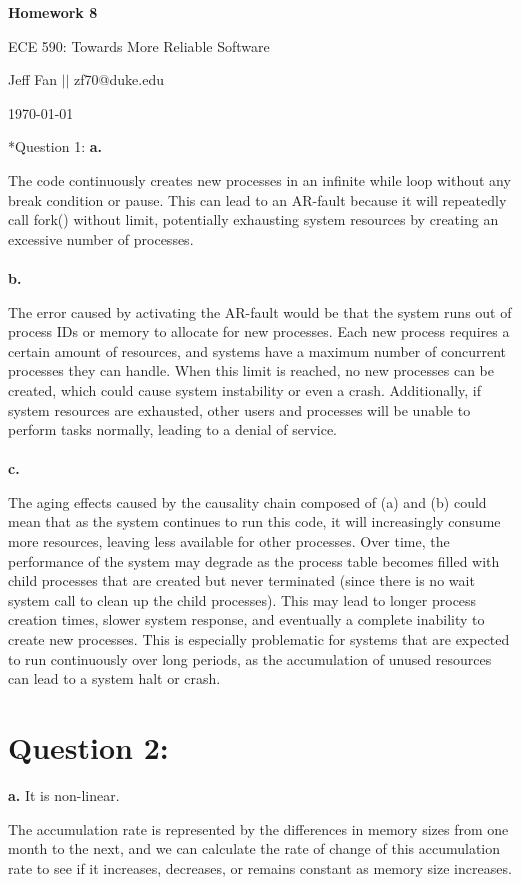 \documentclass[12pt]{article}
\makeatletter
\numberwithin{table}{section}
\newcommand{\question}[2][]{\begin{flushleft}
		\Large\textbf{Question #1}: \large\textit{#2}
		
\end{flushleft}}
\newcommand{\maketitletwo}[2][]{\begin{center}
		\Large{\textbf{Homework #1}
			
			ECE 590: Towards More Reliable Software} %
		\vspace{5pt}
		
		\normalsize{Jeff Fan  \hspace{1em} $\left|\right|$ \hspace{1em}zf70@duke.edu  %
			
			\today}        %
		\vspace{15pt}
		
\end{center}}
\makeatother
\begin{document}
	\maketitletwo[8]  %
	
	\section*{Question 1: } 
	\textbf{a.}
	
	The code continuously creates new processes in an infinite while loop without any break condition or pause. This can lead to an AR-fault because it will repeatedly call fork() without limit, potentially exhausting system resources by creating an excessive number of processes.\\
	\\
	\textbf{b.}
	
	The error caused by activating the AR-fault would be that the system runs out of process IDs or memory to allocate for new processes. Each new process requires a certain amount of resources, and systems have a maximum number of concurrent processes they can handle. When this limit is reached, no new processes can be created, which could cause system instability or even a crash. Additionally, if system resources are exhausted, other users and processes will be unable to perform tasks normally, leading to a denial of service.\\
	\\
	\textbf{c.}
	
	The aging effects caused by the causality chain composed of (a) and (b) could mean that as the system continues to run this code, it will increasingly consume more resources, leaving less available for other processes. Over time, the performance of the system may degrade as the process table becomes filled with child processes that are created but never terminated (since there is no wait system call to clean up the child processes). This may lead to longer process creation times, slower system response, and eventually a complete inability to create new processes. This is especially problematic for systems that are expected to run continuously over long periods, as the accumulation of unused resources can lead to a system halt or crash.
	
	\section*{Question 2: } 
	\textbf{a.}
	It is non-linear.
	
	The accumulation rate is represented by the differences in memory sizes from one month to the next, and we can calculate the rate of change of this accumulation rate to see if it increases, decreases, or remains constant as memory size increases.
	
\end{document}
